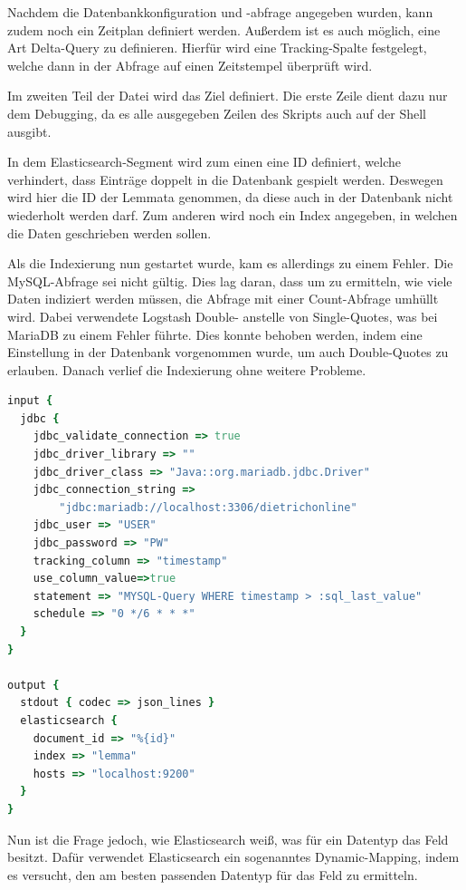 Nachdem die Datenbankkonfiguration und -abfrage angegeben wurden, kann zudem noch ein Zeitplan definiert werden. Außerdem ist es auch möglich, eine Art Delta-Query zu definieren. Hierfür wird eine Tracking-Spalte festgelegt, welche dann in der Abfrage auf einen Zeitstempel überprüft wird.

Im zweiten Teil der Datei wird das Ziel definiert. Die erste Zeile dient dazu nur dem Debugging, da es alle ausgegeben Zeilen des Skripts auch auf der Shell ausgibt. 

In dem Elasticsearch-Segment wird zum einen eine ID definiert, welche verhindert, dass Einträge doppelt in die Datenbank gespielt werden. Deswegen wird hier die ID der Lemmata genommen, da diese auch in der Datenbank nicht wiederholt werden darf. Zum anderen wird noch ein Index angegeben, in welchen die Daten geschrieben werden sollen. 

Als die Indexierung nun gestartet wurde, kam es allerdings zu einem Fehler. Die MySQL-Abfrage sei nicht gültig. Dies lag daran, dass um zu ermitteln, wie viele Daten indiziert werden müssen, die Abfrage mit einer Count-Abfrage umhüllt wird. Dabei verwendete Logstash Double- anstelle von Single-Quotes, was bei MariaDB zu einem Fehler führte. Dies konnte behoben werden, indem eine Einstellung in der Datenbank vorgenommen wurde, um auch Double-Quotes zu erlauben. 
Danach verlief die Indexierung ohne weitere Probleme.

\begin{lstlisting}[language=Ruby, frame=single, label={lst:lsConf}, caption=Konfigurationsdatei für die Logstash-Pipeline,captionpos=b] 
input {
  jdbc {
    jdbc_validate_connection => true
    jdbc_driver_library => ""
    jdbc_driver_class => "Java::org.mariadb.jdbc.Driver"
    jdbc_connection_string =>
        "jdbc:mariadb://localhost:3306/dietrichonline"
    jdbc_user => "USER"
    jdbc_password => "PW"
    tracking_column => "timestamp"
    use_column_value=>true
    statement => "MYSQL-Query WHERE timestamp > :sql_last_value"
    schedule => "0 */6 * * *"
  }
}

output {
  stdout { codec => json_lines }
  elasticsearch {
    document_id => "%{id}"
    index => "lemma"
    hosts => "localhost:9200"
  }
}
\end{lstlisting}

Nun ist die Frage jedoch, wie Elasticsearch weiß, was für ein Datentyp das Feld besitzt. Dafür verwendet Elasticsearch ein sogenanntes Dynamic-Mapping, indem es versucht, den am besten passenden Datentyp für das Feld zu ermitteln.

